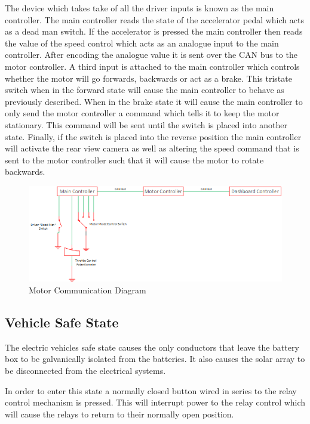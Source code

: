 \documentclass[10pt,a4paper]{article}
\begin{document}
The device which takes take of all the driver inputs is known as the main controller. The main controller reads the state of the accelerator pedal which acts as a dead man switch. If the accelerator is pressed the main controller then reads the value of the speed control which acts as an analogue input to the main controller. After encoding the analogue value it is sent over the CAN bus to the motor controller. A third input is attached to the main controller which controls whether the motor will go forwards, backwards or act as a brake. This tristate switch when in the forward state will cause the main controller to behave as previously described. When in the brake state it will cause the main controller to only send the motor controller a command which tells it to keep the motor stationary. This command will be sent until the switch is placed into another state. Finally, if the switch is placed into the reverse position the main controller will activate the rear view camera as well as altering the speed command that is sent to the motor controller such that it will cause the motor to rotate backwards.

\begin{figure}[H]
\includegraphics[width=\columnwidth]{MotorControlDiagram.png}%
\caption{Motor Communication Diagram}
\label{Fig:MotorControl}
\end{figure}

\subsection{Vehicle Safe State}
The electric vehicles safe state causes the only conductors that leave the battery box to be galvanically isolated from the batteries. It also causes the solar array to be disconnected from the electrical systems. 

In order to enter this state a normally closed button wired in series to the relay control mechanism is pressed. This will interrupt power to the relay control which will cause the relays to return to their normally open position.
\end{document}
